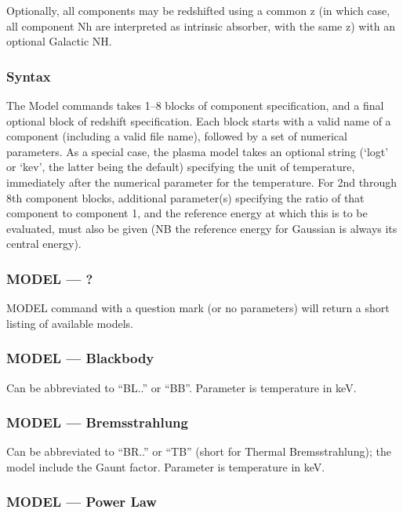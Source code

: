 \documentclass[11pt]{article}
\begin{document}
\begin{appendices}
Optionally,  all components may be redshifted using a common z (in which case,
all component Nh are interpreted as intrinsic absorber, with the same z)  with
an optional Galactic NH.

\subsubsection{Syntax}

The Model commands takes 1--8 blocks of component specification, and a final
optional block of redshift specification.  Each block starts with a valid
name of a component (including a valid file name), followed by a set of
numerical parameters.  As a special case, the plasma model takes an
optional string (`logt' or `kev', the latter being the default) specifying
the unit of temperature, immediately after the numerical parameter for the
temperature.  For 2nd through 8th
component blocks, additional parameter(s) specifying the ratio of that
component to component 1, and the reference energy at which this is to
be evaluated, must also be given (NB the reference energy for Gaussian
is always its central energy).

\subsubsection{MODEL --- ?}

MODEL command  with a question mark  (or no  parameters) will return a short
listing of available models.

\subsubsection{MODEL --- Blackbody}

Can be abbreviated to ``BL..'' or ``BB''.  Parameter is temperature in keV.

\subsubsection{MODEL --- Bremsstrahlung}

Can be abbreviated to ``BR..'' or ``TB'' (short for Thermal Bremsstrahlung); the
model include the Gaunt factor.  Parameter is temperature in keV.

\subsubsection{MODEL --- Power Law}


\end{appendices}
\end{document}
